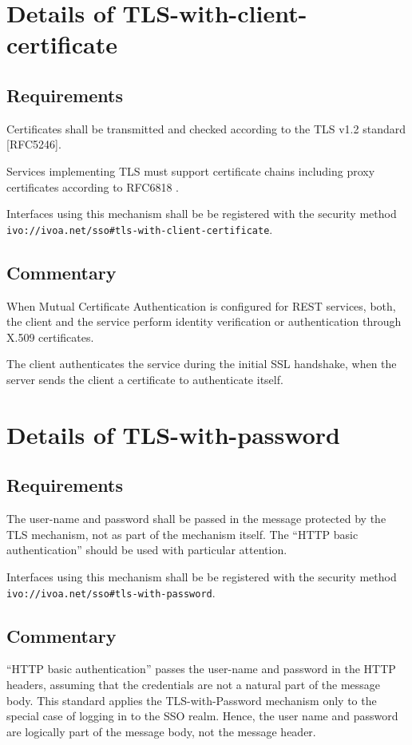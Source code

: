 \documentclass[11pt,a4paper]{ivoa}
\begin{document}
\section{Details of TLS-with-client-certificate}
\subsection{Requirements}
Certificates shall be transmitted and checked according to the TLS v1.2 standard [RFC5246].

Services implementing TLS must support certificate chains including proxy certificates according to RFC6818  \citep{std:RFC6818}.

Interfaces using this mechanism shall be be registered with the security method \texttt{ivo://ivoa.net/sso\#tls-with-client-certificate}.

\subsection{Commentary}
When Mutual Certificate Authentication is configured for REST services, both, the client and the service perform 
identity verification or authentication through X.509 certificates. 

The client authenticates the service during the initial SSL handshake, when the server sends the client a certificate to authenticate itself.

\section{Details of TLS-with-password}
\subsection{Requirements}
The user-name and password shall be passed in the message protected by the TLS mechanism, 
not as part of the mechanism itself. The ``HTTP basic authentication'' should be used with particular attention.

Interfaces using this mechanism shall be be registered with the security method \texttt{ivo://ivoa.net/sso\#tls-with-password}.

\subsection{Commentary}
``HTTP basic authentication'' passes the user-name and password in the HTTP headers, 
assuming that the credentials are not a natural part of the message body. 
This standard applies the TLS-with-Password mechanism only to the special case of logging in to the SSO realm. 
Hence, the user name and password are logically part of the message body, not the message header.
\end{document}
